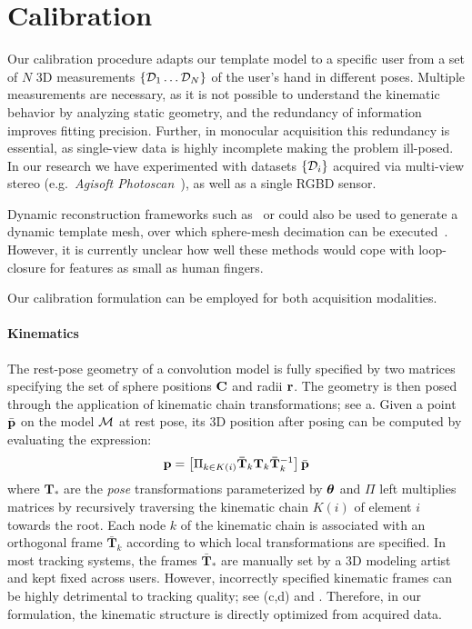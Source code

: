 
\section{Calibration}
\label{sec:modeling}

Our calibration procedure adapts our template model to a specific user from a set of $N$ 3D measurements $\{ \mathcal{D}_1 \dots \mathcal{D}_N \}$ of the user's hand in different poses. Multiple measurements are necessary, as it is not possible to understand the kinematic behavior by analyzing static geometry, and the redundancy of information improves fitting precision. Further, in  monocular acquisition this redundancy is essential, as single-view data is highly incomplete\todo{,} making the problem ill-posed. In our research we have experimented with datasets $\{\mathcal{D}_i\}$ acquired via multi-view stereo (e.g.\ \emph{Agisoft Photoscan~\textcopyright}), as well as a single RGBD sensor. 
\begin{draft}
Dynamic reconstruction frameworks such as~\cite{newcombe2015dynfusion} or \cite{innmann2016volume} could also be used to generate a dynamic template mesh, over which sphere-mesh decimation can be executed~\cite{thiery2016spheremesh}. However, it is currently unclear how well these methods would cope with loop-closure for features as small as human fingers.
\end{draft}
Our calibration formulation can be employed for both acquisition modalities.

\paragraph{Kinematics}
The rest-pose geometry of a convolution model is fully specified by two matrices specifying the set of sphere positions ${\mathbf{C}}$ and radii ${\mathbf{r}}$. The geometry is then posed through the application of  kinematic chain transformations; see a. Given a point $\bar{\mathbf{p}}$ on the model $\mathcal{M}$ at rest pose, its 3D position after posing can be computed by evaluating the expression:
% 
\begin{equation}
\mathbf{p} = \left[ \Pi_{k \in K(i)} \mathbf{\bar{T}}_k \mathbf{T}_k \mathbf{\bar{T}}_k^{-1} \right] \bar{\mathbf{p}}
\label{eq:kinematic}
\end{equation}
%
where $\mathbf{T}_*$ are the \emph{pose} transformations parameterized by $\boldsymbol{\theta}$ and $\Pi$ left multiplies matrices by recursively traversing the kinematic chain $K(i)$ of element $i$ towards the root. Each node $k$ of the kinematic chain is associated with an orthogonal frame $\mathbf{\bar{T}}_k$ according to which local transformations are specified. In most tracking systems, the frames $\mathbf{\bar{T}}_*$ are manually set by a 3D modeling artist and kept fixed across users. However, incorrectly specified kinematic frames can be highly detrimental to tracking quality; see (c,d) and \VideoKinematic{}. Therefore, in our formulation, the kinematic structure is directly optimized from acquired data.

